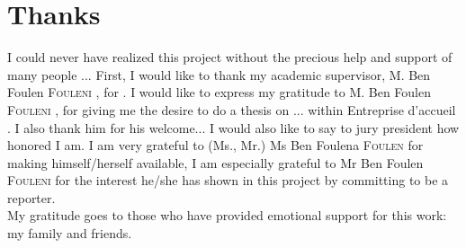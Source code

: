 \documentclass[a4paper, oneside, english, 12pt, final]{extreport}
\newcommand{\studyDepartment} {%
  Entreprise d'accueil %
}
\newcommand{\juryMemberOne} {%
  Ms Ben Foulena \textsc{Foulen}%
}
\newcommand{\juryMemberTwo} {%
  Mr Ben Foulen \textsc{Fouleni}%
}
\newcommand{\juryMemberThree} {%
	M. Ben Foulen \textsc{Fouleni}%
}
\newcommand{\juryMemberFour} {%
	M. Ben Foulen \textsc{Fouleni}%
}
\begin{document}
\chapter*{Thanks}
\thispagestyle{empty}

I could never have realized this project without the precious help and support of many people ... First, I would like to thank my academic supervisor, \juryMemberFour{}, for . I would like to express my gratitude to \juryMemberThree{}, for giving me the desire to do a thesis on ... within \studyDepartment. I also thank him for his welcome... I would also like to say to jury president how honored I am. I am very grateful to (Ms., Mr.) \juryMemberOne{} for making himself/herself available, I am especially grateful to \juryMemberTwo{} for the interest he/she has shown in this project by committing to be a reporter. \\

My gratitude goes to those who have provided emotional support for this work: my family and friends.  



\tableofcontents
{}
\cleardoublepage%

\listoffigures
\cleardoublepage%

\listoftables
\cleardoublepage

\listofalgorithms
{}



\printglossaries


\cleardoublepage
    






\end{document}
